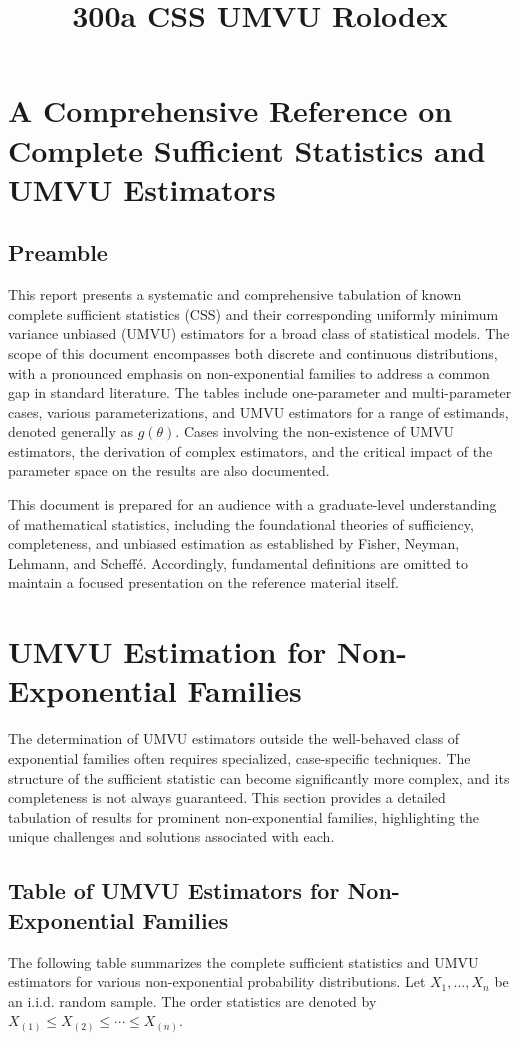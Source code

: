 \documentclass[11pt, letterpaper]{article}
\title{300a CSS UMVU Rolodex}
\begin{document}
\section*{A Comprehensive Reference on Complete Sufficient Statistics and UMVU Estimators}

\subsection*{Preamble}
This report presents a systematic and comprehensive tabulation of known complete sufficient statistics (CSS) and their corresponding uniformly minimum variance unbiased (UMVU) estimators for a broad class of statistical models. The scope of this document encompasses both discrete and continuous distributions, with a pronounced emphasis on non-exponential families to address a common gap in standard literature. The tables include one-parameter and multi-parameter cases, various parameterizations, and UMVU estimators for a range of estimands, denoted generally as $g(\theta)$. Cases involving the non-existence of UMVU estimators, the derivation of complex estimators, and the critical impact of the parameter space on the results are also documented.

This document is prepared for an audience with a graduate-level understanding of mathematical statistics, including the foundational theories of sufficiency, completeness, and unbiased estimation as established by Fisher, Neyman, Lehmann, and Scheffé. Accordingly, fundamental definitions are omitted to maintain a focused presentation on the reference material itself.

\section*{UMVU Estimation for Non-Exponential Families}
The determination of UMVU estimators outside the well-behaved class of exponential families often requires specialized, case-specific techniques. The structure of the sufficient statistic can become significantly more complex, and its completeness is not always guaranteed. This section provides a detailed tabulation of results for prominent non-exponential families, highlighting the unique challenges and solutions associated with each.

\subsection*{Table of UMVU Estimators for Non-Exponential Families}
The following table summarizes the complete sufficient statistics and UMVU estimators for various non-exponential probability distributions. Let $X_1, \dots, X_n$ be an i.i.d. random sample. The order statistics are denoted by $X_{(1)} \le X_{(2)} \le \cdots \le X_{(n)}$.
\end{document}
